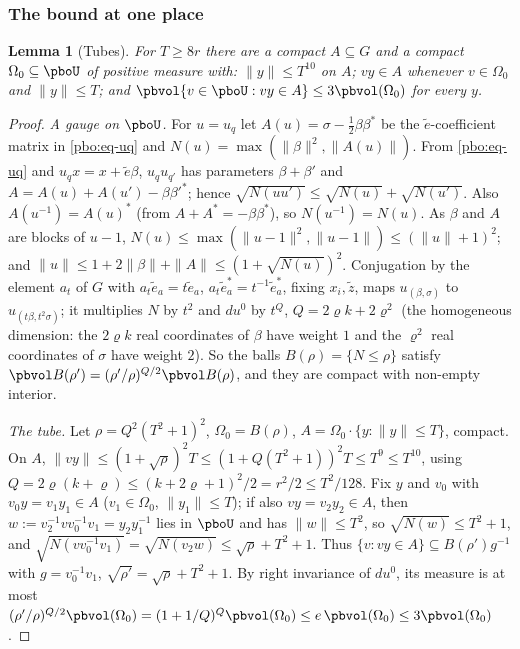 \documentclass[10pt]{amsart}
\newtheorem{lemma}[theorem]{Lemma}
\theoremstyle{definition}
\theoremstyle{remark}
\begin{document}
\subsubsection{The bound at one place}\label{pbo:ss-onplace}

\begin{lemma}[Tubes]\label{pbo:tube}
For $T\ge8r$ there are a compact $A\subseteq G$ and a compact $\Omega_0\subseteq\pboU$ of positive measure
with: $\|y\|\le T^{10}$ on $A$; $vy\in A$ whenever $v\in\Omega_0$ and $\|y\|\le T$; and $\pbvol\{v\in\pboU:vy\in
A\}\le3\pbvol(\Omega_0)$ for every $y$.
\end{lemma}
\begin{proof}
\emph{A gauge on $\pboU$.} For $u=u_q$ let $A(u)=\sigma-\frac12\beta\beta^*$ be the $\tilde e$-coefficient matrix in
\eqref{pbo:eq-uq} and $N(u)=\max(\|\beta\|^2,\|A(u)\|)$. From \eqref{pbo:eq-uq} and $u_qx=x+\tilde e\beta$,
$u_qu_{q'}$ has parameters $\beta+\beta'$ and $A=A(u)+A(u')-\beta\beta'^*$; hence $\sqrt{N(uu')}\le\sqrt{N(u)}+
\sqrt{N(u')}$. Also $A(u^{-1})=A(u)^*$ (from $A+A^*=-\beta\beta^*$), so $N(u^{-1})=N(u)$. As $\beta$ and $A$ are
blocks of $u-1$, $N(u)\le\max(\|u-1\|^2,\|u-1\|)\le(\|u\|+1)^2$; and $\|u\|\le1+2\|\beta\|+\|A\|\le(1+\sqrt{N(u)})^2$.
Conjugation by the element $a_t$ of $G$ with $a_t\tilde e_a=t\tilde e_a$, $a_t\tilde e^*_a=t^{-1}\tilde e^*_a$, fixing
$x_i,\tilde z$, maps $u_{(\beta,\sigma)}$ to $u_{(t\beta,t^2\sigma)}$; it multiplies $N$ by $t^2$ and $du^0$ by $t^Q$,
$Q=2\varrho k+2\varrho^2$ (the homogeneous dimension: the $2\varrho k$ real coordinates of $\beta$ have weight $1$ and the $\varrho^2$ real coordinates of $\sigma$ have weight $2$). So the balls $B(\rho)=\{N\le\rho\}$ satisfy
$\pbvol B(\rho')=(\rho'/\rho)^{Q/2}\pbvol B(\rho)$, and they are compact with non-empty interior.

\emph{The tube.} Let $\rho=Q^2(T^2+1)^2$, $\Omega_0=B(\rho)$, $A=\Omega_0\cdot\{y:\|y\|\le T\}$, compact. On $A$,
$\|vy\|\le(1+\sqrt\rho)^2T\le(1+Q(T^2+1))^2T\le T^9\le T^{10}$, using $Q=2\varrho(k+\varrho)\le(k+2\varrho+1)^2/2=r^2/2\le T^2/128$. Fix $y$ and $v_0$ with
$v_0y=v_1y_1\in A$ ($v_1\in\Omega_0$, $\|y_1\|\le T$); if also $vy=v_2y_2\in A$, then $w:=v_2^{-1}vv_0^{-1}v_1=y_2y_1^{-1}$
lies in $\pboU$ and has $\|w\|\le T^2$, so $\sqrt{N(w)}\le T^2+1$, and $\sqrt{N(vv_0^{-1}v_1)}=\sqrt{N(v_2w)}\le\sqrt\rho+
T^2+1$. Thus $\{v:vy\in A\}\subseteq B(\rho')g^{-1}$ with $g=v_0^{-1}v_1$, $\sqrt{\rho'}=\sqrt\rho+T^2+1$. By right
invariance of $du^0$, its measure is at most $(\rho'/\rho)^{Q/2}\pbvol(\Omega_0)=(1+1/Q)^Q\pbvol(\Omega_0)\le
e\,\pbvol(\Omega_0)\le3\pbvol(\Omega_0)$.
\end{proof}
\end{document}

